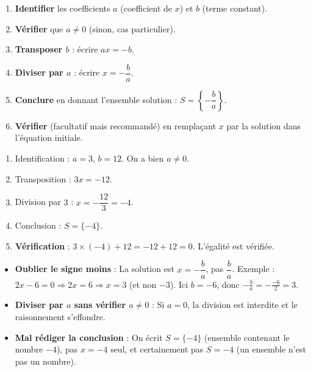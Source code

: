 \documentclass[11pt]{article}
\begin{document}
\begin{methode}[Résoudre une équation de la forme $ax + b = 0$]
\begin{enumerate}
    \item \textbf{Identifier} les coefficients $a$ (coefficient de $x$) et $b$ (terme constant).
    \item \textbf{Vérifier} que $a \neq 0$ (sinon, cas particulier).
    \item \textbf{Transposer $b$} : écrire $ax = -b$.
    \item \textbf{Diviser par $a$} : écrire $x = -\dfrac{b}{a}$.
    \item \textbf{Conclure} en donnant l'ensemble solution : $S = \left\{-\dfrac{b}{a}\right\}$.
    \item \textbf{Vérifier} (facultatif mais recommandé) en remplaçant $x$ par la solution dans l'équation initiale.
\end{enumerate}
\end{methode}

\begin{exemplebox}[Résolution de $3x + 12 = 0$]
\begin{enumerate}
    \item Identification : $a = 3$, $b = 12$. On a bien $a \neq 0$.
    \item Transposition : $3x = -12$.
    \item Division par $3$ : $x = -\dfrac{12}{3} = -4$.
    \item Conclusion : $S = \{-4\}$.
    \item \textbf{Vérification} : $3 \times (-4) + 12 = -12 + 12 = 0$. L'égalité est vérifiée.
\end{enumerate}
\end{exemplebox}

\begin{attention}
\begin{itemize}
    \item \textbf{Oublier le signe moins} : La solution est $x = -\dfrac{b}{a}$, pas $\dfrac{b}{a}$. Exemple : $2x - 6 = 0 \Rightarrow 2x = 6 \Rightarrow x = 3$ (et non $-3$). Ici $b = -6$, donc $-\frac{b}{a} = -\frac{-6}{2} = 3$.
    \item \textbf{Diviser par $a$ sans vérifier $a \neq 0$} : Si $a = 0$, la division est interdite et le raisonnement s'effondre.
    \item \textbf{Mal rédiger la conclusion} : On écrit $S = \{-4\}$ (ensemble contenant le nombre $-4$), pas $x = -4$ seul, et certainement pas $S = -4$ (un ensemble n'est pas un nombre).
\end{itemize}
\end{attention}
\end{document}
